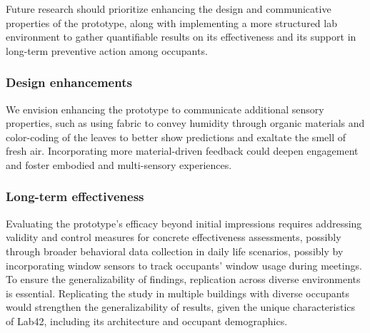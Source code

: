 Future research should prioritize enhancing the design and communicative properties of the prototype, along with implementing a more structured lab environment to gather quantifiable results on its effectiveness and its support in long-term preventive action among occupants. 

\subsubsection{Design enhancements}
We envision enhancing the prototype to communicate additional sensory properties, such as using fabric to convey humidity through organic materials and color-coding of the leaves to better show predictions and exaltate the smell of fresh air. Incorporating more material-driven feedback could deepen engagement and foster embodied and multi-sensory experiences. 

\subsubsection{Long-term effectiveness}
Evaluating the prototype's efficacy beyond initial impressions requires addressing validity and control measures for concrete effectiveness assessments, possibly through broader behavioral data collection in daily life scenarios, possibly by incorporating window sensors to track occupants' window usage during meetings. To ensure the generalizability of findings, replication across diverse environments is essential. Replicating the study in multiple buildings with diverse occupants would strengthen the generalizability of results, given the unique characteristics of Lab42, including its architecture and occupant demographics.